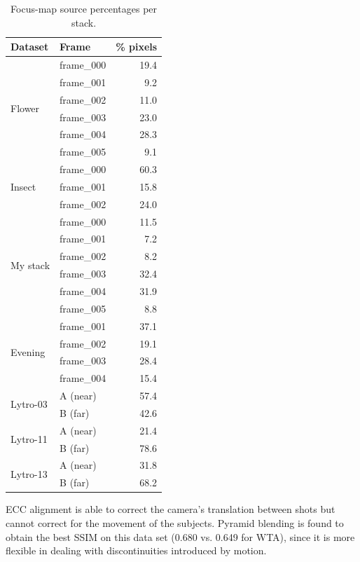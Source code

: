 \documentclass[conference]{IEEEtran}
\begin{document}
\begin{table}[!ht]
\centering
\caption{Focus-map source percentages per stack.}
\label{tab:focus_map}
\begin{tabular}{llr}
\toprule
Dataset & Frame & \% pixels \\
\midrule
\multirow{6}{*}{Flower}
  & frame\_000 & 19.4 \\
  & frame\_001 &  9.2 \\
  & frame\_002 & 11.0 \\
  & frame\_003 & 23.0 \\
  & frame\_004 & 28.3 \\
  & frame\_005 &  9.1 \\
\midrule
\multirow{3}{*}{Insect}
  & frame\_000 & 60.3 \\
  & frame\_001 & 15.8 \\
  & frame\_002 & 24.0 \\
\midrule
\multirow{6}{*}{My stack}
  & frame\_000 & 11.5 \\
  & frame\_001 &  7.2 \\
  & frame\_002 &  8.2 \\
  & frame\_003 & 32.4 \\
  & frame\_004 & 31.9 \\
  & frame\_005 &  8.8 \\
\midrule
\multirow{4}{*}{Evening}
  & frame\_001 & 37.1 \\
  & frame\_002 & 19.1 \\
  & frame\_003 & 28.4 \\
  & frame\_004 & 15.4 \\
\midrule
\multirow{2}{*}{Lytro-03}
  & A (near)   & 57.4 \\
  & B (far)    & 42.6 \\
\midrule
\multirow{2}{*}{Lytro-11}
  & A (near)   & 21.4 \\
  & B (far)    & 78.6 \\
\midrule
\multirow{2}{*}{Lytro-13}
  & A (near)   & 31.8 \\
  & B (far)    & 68.2 \\
\bottomrule
\end{tabular}
\end{table}

ECC alignment is able to correct the camera's translation between shots but cannot correct for the movement of the subjects. Pyramid blending is found to obtain the best SSIM on this data set (0.680 vs. 0.649 for WTA), since it is more flexible in dealing with discontinuities introduced by motion.
\end{document}
